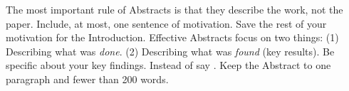 The most important rule of Abstracts is that they describe the work, not the paper. 
Include, at most, one sentence of motivation. 
Save the rest of your motivation for the
Introduction. Effective Abstracts focus on two things: (1) Describing what was \emph{done}. (2) Describing what was \emph{found} (key results). 
Be specific about your key findings. 
Instead of  say . 
Keep the Abstract to one paragraph and
fewer than 200 words.